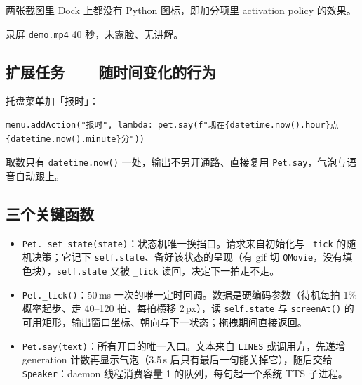 \documentclass[a4paper, 12pt, linespread=1.35]{ctexart}   %
\newcommand{\keepwithnext}{\par\nobreak}
\begin{document}
两张截图里 Dock 上都没有 Python 图标，即加分项里 activation policy 的效果。

录屏 \texttt{demo.mp4} 40 秒，未露脸、无讲解。

\subsection{扩展任务——随时间变化的行为}
托盘菜单加「报时」：\keepwithnext
\begin{lstlisting}
menu.addAction("报时", lambda: pet.say(f"现在{datetime.now().hour}点{datetime.now().minute}分"))
\end{lstlisting}
取数只有 \texttt{datetime.now()} 一处，输出不另开通路、直接复用 \texttt{Pet.say}，气泡与语音自动跟上。


\subsection{三个关键函数}
\begin{itemize}
  \item \texttt{Pet.\_set\_state(state)}：状态机唯一换挡口。请求来自初始化与 \texttt{\_tick} 的随机决策；它记下 \texttt{self.state}、备好该状态的呈现（有 gif 切 \texttt{QMovie}，没有填色块），\texttt{self.state} 又被 \texttt{\_tick} 读回，决定下一拍走不走。
  \item \texttt{Pet.\_tick()}：50\,ms 一次的唯一定时回调。数据是硬编码参数（待机每拍 1\% 概率起步、走 40--120 拍、每拍横移 2\,px），读 \texttt{self.state} 与 \texttt{screenAt()} 的可用矩形，输出窗口坐标、朝向与下一状态；拖拽期间直接返回。
  \item \texttt{Pet.say(text)}：所有开口的唯一入口。文本来自 \texttt{LINES} 或调用方，先递增 generation 计数再显示气泡（3.5\,s 后只有最后一句能关掉它），随后交给 \texttt{Speaker}：daemon 线程消费容量 1 的队列，每句起一个系统 TTS 子进程。
\end{itemize}
\end{document}
